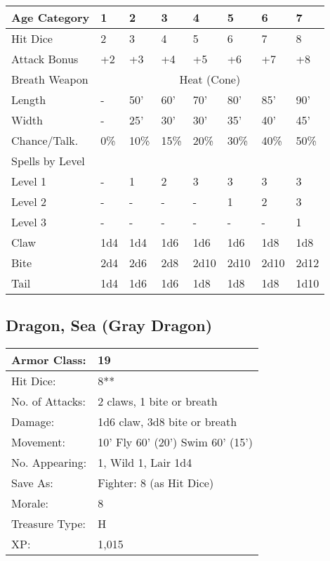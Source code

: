 \documentclass[a4paper,twoside,openany,10pt]{book}
\begin{document}
\begin{multicols}{2}
\begin{center}
\begin{tabularx}{0.47\textwidth}{@{}lXXXXXXX@{}}
Age Category & 1 & 2 & 3 & 4 & 5 & 6 & 7 \\\hline
Hit Dice & 2 & 3 & 4 & 5 & 6 & 7 & 8 \\\hline
Attack Bonus & +2 & +3 & +4 & +5 & +6 & +7 & +8 \\\hline
Breath Weapon & \multicolumn{7}{c}{Heat (Cone)}\\\hline
Length & - & 50' & 60' & 70' & 80' & 85' & 90' \\\hline
Width & - & 25' & 30' & 30' & 35' & 40' & 45' \\\hline
Chance/Talk. & 0\% & 10\% & 15\% & 20\% & 30\% & 40\% & 50\% \\\hline
Spells by Level & & & & & & & \\\hline
Level 1 & - & 1 & 2 & 3 & 3 & 3 & 3 \\\hline
Level 2 & - & - & - & - & 1 & 2 & 3 \\\hline
Level 3 & - & - & - & - & - & - & 1 \\\hline
Claw & 1d4 & 1d4 & 1d6 & 1d6 & 1d6 & 1d8 & 1d8 \\\hline
Bite & 2d4 & 2d6 & 2d8 & 2d10 & 2d10 & 2d10 & 2d12 \\\hline
Tail & 1d4 & 1d6 & 1d6 & 1d8 & 1d8 & 1d8 & 1d10 \\\hline
\end{tabularx}
\end{center}
	
\subsection*{Dragon, Sea (Gray Dragon)}\label{dragon-sea-gray-dragon}

\begin{tabularx}{0.48\textwidth}{@{}lX@{}}
Armor Class: & 19 \\\hline
Hit Dice: & 8** \\\hline
No. of Attacks: & 2 claws, 1 bite or breath \\\hline
Damage: & 1d6 claw, 3d8 bite or breath \\\hline
Movement: & 10' Fly 60'
(20') Swim 60' (15') \\\hline
No. Appearing: & 1, Wild 1, Lair 1d4 \\\hline
Save As: & Fighter: 8 (as Hit Dice) \\\hline
Morale: & 8 \\\hline
Treasure Type: & H \\\hline
XP: & 1,015 \\\hline
\end{tabularx}\medskip


\end{multicols}
\end{document}
